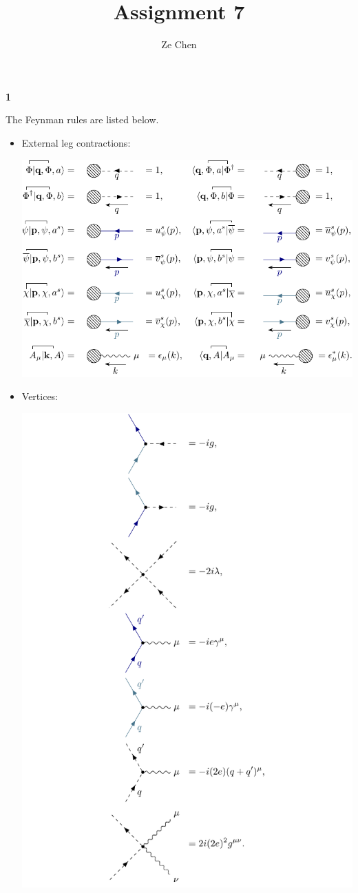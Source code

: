 \documentclass{article}
\title{Assignment 7}
\author{Ze Chen}
\makeatletter
\newcommand*{\shifttext}[1]{%
  \settowidth{\@tempdima}{#1}%
  \hspace{-\@tempdima}#1%
}
\newcommand{\plabel}[1]{%
\shifttext{\textbf{#1}\quad}%
}
\makeatother
\begin{document}
\maketitle

\plabel{1}
The Feynman rules are listed below.
\begin{itemize}
    \item External leg contractions:
    \begin{center}
        \includegraphics{img/leg/leg.pdf}
    \end{center}
    \item Vertices:
    \begin{center}
        \includegraphics{img/vertex/vertex.pdf}

\end{center}
\end{itemize}
\end{document}
